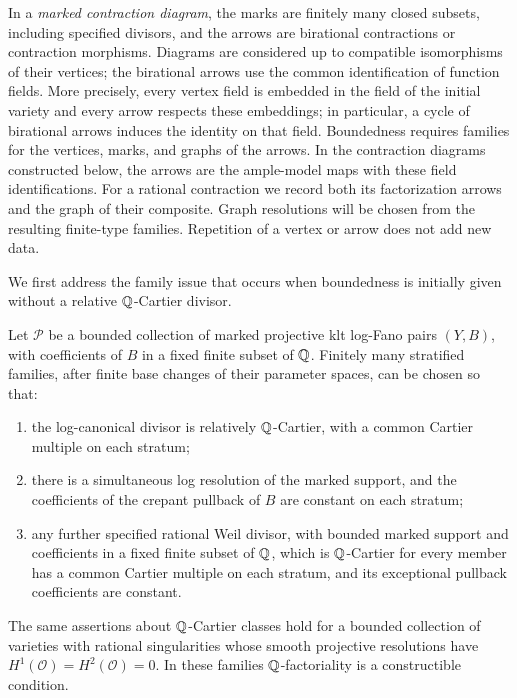 In a \emph{marked contraction diagram}, the marks are finitely many
closed subsets, including specified divisors, and the arrows are
birational contractions or contraction morphisms. Diagrams
are considered up to compatible isomorphisms of their vertices; the
birational arrows use the common identification of function fields.
More precisely, every vertex field is embedded in the field of the
initial variety and every arrow respects these embeddings; in
particular, a cycle of birational arrows induces the identity on
that field.
Boundedness requires families for the vertices, marks, and graphs of
the arrows. In the contraction diagrams constructed below, the arrows
are the ample-model maps with these field identifications.
For a rational contraction we record both its factorization arrows
and the graph of their composite.
Graph resolutions will be chosen from the resulting
finite-type families. Repetition of a vertex or arrow does not add new data.

We first address the family issue that occurs when boundedness is
initially given without a relative $\mathbb Q$-Cartier divisor.

\begin{lemma}
\label{bd:cartier-strata}
Let $\mathcal P$ be a bounded collection of marked projective klt
log-Fano pairs $(Y,B)$, with coefficients of $B$ in a fixed finite
subset of $\mathbb Q$.  Finitely many stratified families, after finite
base changes of their parameter spaces, can be chosen so that:
\begin{enumerate}[label=\textup{(\roman*)}]
\item the log-canonical divisor is relatively $\mathbb Q$-Cartier, with a
common Cartier multiple on each stratum;
\item there is a simultaneous log resolution of the marked support,
and the coefficients of the crepant pullback of $B$ are constant on
each stratum;
\item any further specified rational Weil divisor, with bounded
marked support and coefficients in a fixed finite subset of $\mathbb Q$,
which is $\mathbb Q$-Cartier for every member has a common Cartier multiple
on each stratum, and its exceptional pullback coefficients are constant.
\end{enumerate}
The same assertions about $\mathbb Q$-Cartier classes hold for a bounded
collection of varieties with rational singularities whose smooth
projective resolutions have $H^1(\mathcal O)=H^2(\mathcal O)=0$.
In these families $\mathbb Q$-factoriality is a constructible condition.
\end{lemma}

